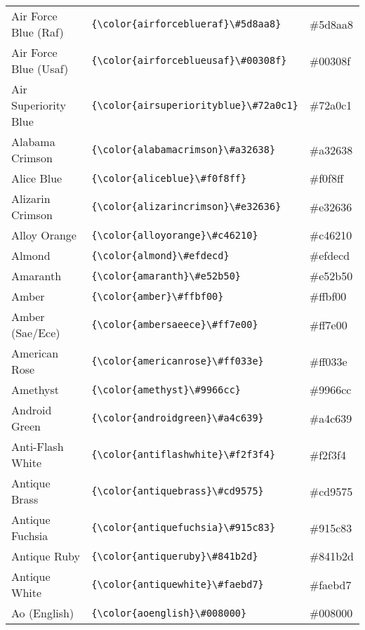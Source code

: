 \documentclass[9.5pt]{article}
\begin{document}
\begin{longtable}{l | l | l}
	Air Force Blue (Raf) & \verb!{\color{airforceblueraf}\#5d8aa8}! & {\color{airforceblueraf}\#5d8aa8}\\
	Air Force Blue (Usaf) & \verb!{\color{airforceblueusaf}\#00308f}! & {\color{airforceblueusaf}\#00308f}\\
	Air Superiority Blue & \verb!{\color{airsuperiorityblue}\#72a0c1}! & {\color{airsuperiorityblue}\#72a0c1}\\
	Alabama Crimson & \verb!{\color{alabamacrimson}\#a32638}! & {\color{alabamacrimson}\#a32638}\\
	Alice Blue & \verb!{\color{aliceblue}\#f0f8ff}! & {\color{aliceblue}\#f0f8ff}\\
	Alizarin Crimson & \verb!{\color{alizarincrimson}\#e32636}! & {\color{alizarincrimson}\#e32636}\\
	Alloy Orange & \verb!{\color{alloyorange}\#c46210}! & {\color{alloyorange}\#c46210}\\
	Almond & \verb!{\color{almond}\#efdecd}! & {\color{almond}\#efdecd}\\
	Amaranth & \verb!{\color{amaranth}\#e52b50}! & {\color{amaranth}\#e52b50}\\
	Amber & \verb!{\color{amber}\#ffbf00}! & {\color{amber}\#ffbf00}\\
	Amber (Sae/Ece) & \verb!{\color{ambersaeece}\#ff7e00}! & {\color{ambersaeece}\#ff7e00}\\
	American Rose & \verb!{\color{americanrose}\#ff033e}! & {\color{americanrose}\#ff033e}\\
	Amethyst & \verb!{\color{amethyst}\#9966cc}! & {\color{amethyst}\#9966cc}\\
	Android Green & \verb!{\color{androidgreen}\#a4c639}! & {\color{androidgreen}\#a4c639}\\
	Anti-Flash White & \verb!{\color{antiflashwhite}\#f2f3f4}! & {\color{antiflashwhite}\#f2f3f4}\\
	Antique Brass & \verb!{\color{antiquebrass}\#cd9575}! & {\color{antiquebrass}\#cd9575}\\
	Antique Fuchsia & \verb!{\color{antiquefuchsia}\#915c83}! & {\color{antiquefuchsia}\#915c83}\\
	Antique Ruby & \verb!{\color{antiqueruby}\#841b2d}! & {\color{antiqueruby}\#841b2d}\\
	Antique White & \verb!{\color{antiquewhite}\#faebd7}! & {\color{antiquewhite}\#faebd7}\\
	Ao (English) & \verb!{\color{aoenglish}\#008000}! & {\color{aoenglish}\#008000}\\

\end{longtable}
\end{document}
